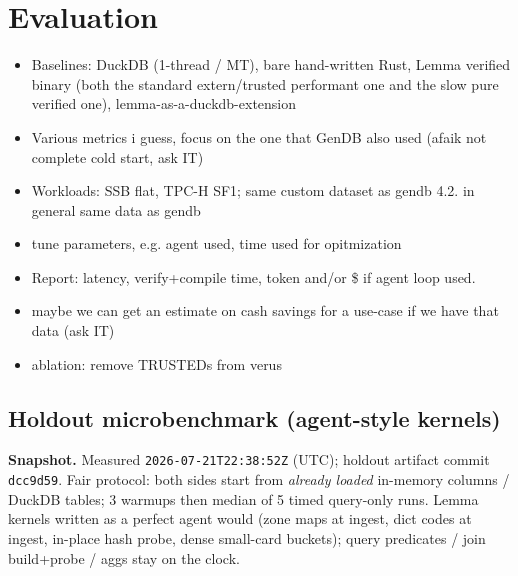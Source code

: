\documentclass[sigconf, nonacm]{acmart}
\begin{document}
\section{Evaluation}

\begin{itemize}
  \item Baselines: DuckDB (1-thread / MT), bare hand-written Rust, Lemma verified binary (both the standard extern/trusted performant one and the slow pure verified one), lemma-as-a-duckdb-extension
  \item Various metrics i guess, focus on the one that GenDB also used (afaik not complete cold start, ask IT)
  \item Workloads: SSB flat, TPC-H SF1; same custom dataset as gendb 4.2. in general same data as gendb
  \item tune parameters, e.g. agent used, time used for opitmization
  \item Report: latency, verify+compile time, token and/or \$ if agent loop used.
  \item maybe we can get an estimate on cash savings for a use-case if we have that data (ask IT)
  \item ablation: remove TRUSTEDs from verus
\end{itemize}


\subsection{Holdout microbenchmark (agent-style kernels)}
\label{sec:holdout-eval}

\noindent\textbf{Snapshot.}
Measured \texttt{2026-07-21T22:38:52Z} (UTC); holdout artifact commit \texttt{dcc9d59}.
Fair protocol: both sides
start from \emph{already loaded} in-memory columns / DuckDB tables; 3 warmups then
median of 5 timed query-only runs. Lemma kernels written as a perfect agent would
(zone maps at ingest, dict codes at ingest, in-place hash probe, dense small-card
buckets); query predicates / join build+probe / aggs stay on the clock.
\end{document}
